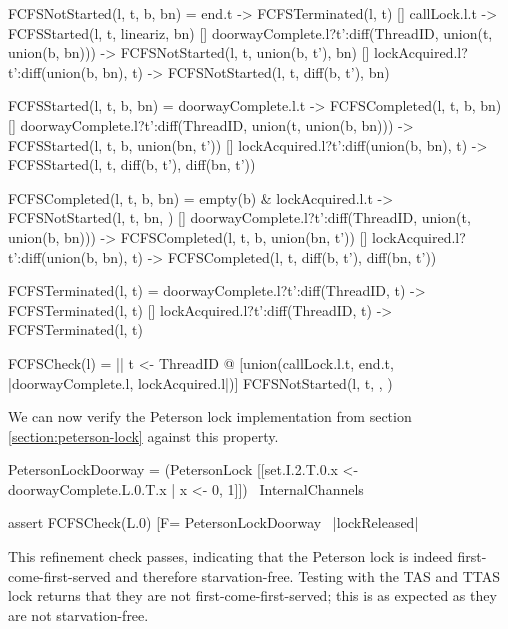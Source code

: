 \begin{cspm}[caption={The CSP specification for first-come-first-served}, label={CSP:FCFS}]
  FCFSNotStarted(l, t, b, bn) = 
     end.t -> FCFSTerminated(l, t)
  [] callLock.l.t -> FCFSStarted(l, t, lineariz, bn)
  [] doorwayComplete.l?t':diff(ThreadID, union({t}, union(b, bn))) -> FCFSNotStarted(l, t, union(b, {t'}), bn)
  [] lockAcquired.l?t':diff(union(b, bn), {t}) -> FCFSNotStarted(l, t, diff(b, {t'}), bn)


FCFSStarted(l, t, b, bn) = 
     doorwayComplete.l.t -> FCFSCompleted(l, t, b, bn)
  [] doorwayComplete.l?t':diff(ThreadID, union({t}, union(b, bn))) -> FCFSStarted(l, t, b, union(bn, {t'}))
  [] lockAcquired.l?t':diff(union(b, bn), {t}) -> FCFSStarted(l, t, diff(b, {t'}), diff(bn, {t'}))

FCFSCompleted(l, t, b, bn) = 
     empty(b) & lockAcquired.l.t -> FCFSNotStarted(l, t, bn, {})
  [] doorwayComplete.l?t':diff(ThreadID, union({t}, union(b, bn))) -> FCFSCompleted(l, t, b, union(bn, {t'}))
  [] lockAcquired.l?t':diff(union(b, bn), {t}) -> FCFSCompleted(l, t, diff(b, {t'}), diff(bn, {t'}))

FCFSTerminated(l, t) = 
     doorwayComplete.l?t':diff(ThreadID, {t}) -> FCFSTerminated(l, t)
  [] lockAcquired.l?t':diff(ThreadID, {t}) -> FCFSTerminated(l, t)

FCFSCheck(l) = 
  || t <- ThreadID @ [union({callLock.l.t, end.t}, {|doorwayComplete.l, lockAcquired.l|})]
        FCFSNotStarted(l, t, {}, {})
\end{cspm}

We can now verify the Peterson lock implementation from section \ref{section:peterson-lock} against this property.

\begin{cspm}
PetersonLockDoorway = 
  (PetersonLock 
    [[set.I.2.T.0.x <- doorwayComplete.L.0.T.x | x <- {0, 1}]]) 
        \ InternalChannels

assert FCFSCheck(L.0) [F= PetersonLockDoorway \ {|lockReleased|}
\end{cspm}

This refinement check passes, indicating that the Peterson lock is indeed first-come-first-served and therefore starvation-free. Testing with the TAS and TTAS lock returns that they are not first-come-first-served; this is as expected as they are not starvation-free.

